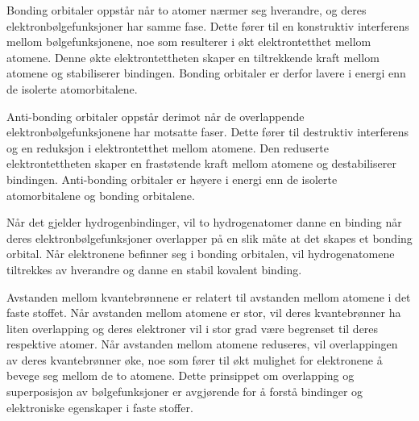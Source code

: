 Bonding orbitaler oppstår når to atomer nærmer seg hverandre, og deres elektronbølgefunksjoner har samme fase. Dette fører til en konstruktiv interferens mellom bølgefunksjonene, noe som resulterer i økt elektrontetthet mellom atomene. Denne økte elektrontettheten skaper en tiltrekkende kraft mellom atomene og stabiliserer bindingen. Bonding orbitaler er derfor lavere i energi enn de isolerte atomorbitalene.

Anti-bonding orbitaler oppstår derimot når de overlappende elektronbølgefunksjonene har motsatte faser. Dette fører til destruktiv interferens og en reduksjon i elektrontetthet mellom atomene. Den reduserte elektrontettheten skaper en frastøtende kraft mellom atomene og destabiliserer bindingen. Anti-bonding orbitaler er høyere i energi enn de isolerte atomorbitalene og bonding orbitalene.

Når det gjelder hydrogenbindinger, vil to hydrogenatomer danne en binding når deres elektronbølgefunksjoner overlapper på en slik måte at det skapes et bonding orbital. Når elektronene befinner seg i bonding orbitalen, vil hydrogenatomene tiltrekkes av hverandre og danne en stabil kovalent binding.

Avstanden mellom kvantebrønnene er relatert til avstanden mellom atomene i det faste stoffet. Når avstanden mellom atomene er stor, vil deres kvantebrønner ha liten overlapping og deres elektroner vil i stor grad være begrenset til deres respektive atomer. Når avstanden mellom atomene reduseres, vil overlappingen av deres kvantebrønner øke, noe som fører til økt mulighet for elektronene å bevege seg mellom de to atomene. Dette prinsippet om overlapping og superposisjon av bølgefunksjoner er avgjørende for å forstå bindinger og elektroniske egenskaper i faste stoffer.